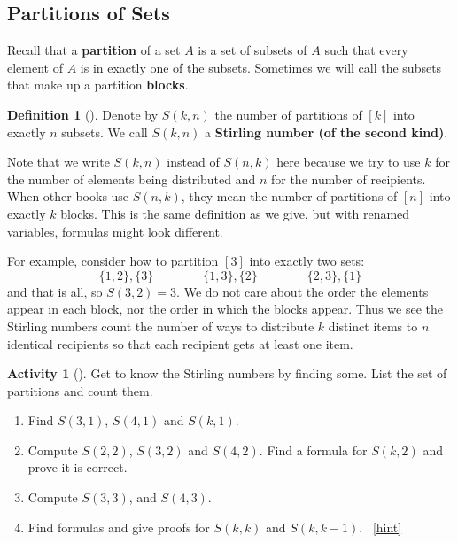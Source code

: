 \documentclass[10pt,]{book}
\newcommand{\terminology}[1]{\textbf{#1}}
\theoremstyle{plain}
\theoremstyle{definition}
\newtheorem{definition}[theorem]{Definition}
\theoremstyle{definition}
\theoremstyle{definition}
\newtheorem{activity}[project]{Activity}
\numberwithin{equation}{chapter}
\begin{document}
\subsection[{Partitions of Sets}]{Partitions of Sets}\label{subsection-13}
\hypertarget{p-656}{}%
Recall that a \terminology{partition} of a set \(A\) is a set of subsets of \(A\) such that every element of \(A\) is in exactly one of the subsets.  Sometimes we will call the subsets that make up a partition \terminology{blocks}.%
\begin{definition}[{}]\label{def-stirling}
\hypertarget{p-657}{}%
Denote by \(S(k,n)\) the number of partitions of \([k]\) into exactly \(n\) subsets.  We call \(S(k,n)\) a \terminology{Stirling number (of the second kind)}.%
\end{definition}
\hypertarget{p-658}{}%
Note that we write \(S(k,n)\) instead of \(S(n,k)\) here because we try to use \(k\) for the number of elements being distributed and \(n\) for the number of recipients.  When other books use \(S(n,k)\), they mean the number of partitions of \([n]\) into exactly \(k\) blocks.  This is the same definition as we give, but with renamed variables, formulas might look different.%
\par
\hypertarget{p-659}{}%
For example, consider how to partition \([3]\) into exactly two sets:%
\begin{equation*}
\{1,2\}, \{3\} \qquad \qquad \{1,3\},\{2\} \qquad \qquad \{2,3\},\{1\}
\end{equation*}
and that is all, so \(S(3,2) = 3\).  We do not care about the order the elements appear in each block, nor the order in which the blocks appear.  Thus we see the Stirling numbers count the number of ways to distribute \(k\) distinct items to \(n\) identical recipients so that each recipient gets at least one item.%
\begin{activity}[]\label{act_stirlingcomputations}
\hypertarget{p-660}{}%
Get to know the Stirling numbers by finding some.  List the set of partitions and count them.%
\begin{enumerate}[font=\bfseries,label=(\alph*),ref=\alph*]
\item\label{task-138} \hypertarget{p-661}{}%
Find \(S(3,1)\), \(S(4,1)\) and \(S(k,1)\).%
\item\label{task-139} \hypertarget{p-662}{}%
Compute \(S(2,2)\), \(S(3,2)\) and \(S(4,2)\).  Find a formula for \(S(k,2)\) and prove it is correct.%
\item\label{task-140} \hypertarget{p-663}{}%
Compute \(S(3,3)\), and \(S(4,3)\).%
\item\label{task-141} \hypertarget{p-664}{}%
Find formulas and give proofs for \(S(k,k)\) and \(S(k,k - 1)\).%
~\hfill{\tiny\hyperlink{a-136.d}{[hint]}\hypertarget{q-136.d}{}}\end{enumerate}
\end{activity}
\end{document}
